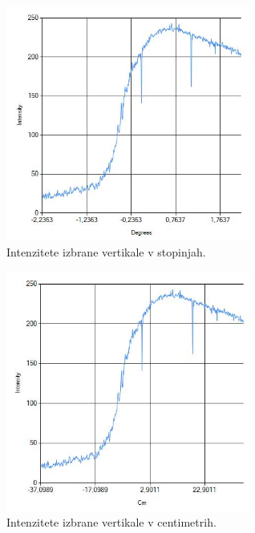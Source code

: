 \documentclass[oneside, a4paper, 12pt]{book}
\begin{document}
\begin{figure}
\begin{center}
\includegraphics[width=8cm]{slike/intenzitete.jpg}
\end{center}
\caption{Intenzitete izbrane vertikale v stopinjah.}
\label{pic:intenzitete1}
\end{figure}

\begin{figure}
\begin{center}
\includegraphics[width=8cm]{slike/intenzitete-v-cm.jpg}
\end{center}
\caption{Intenzitete izbrane vertikale v centimetrih.}
\label{pic:intenzitete2}
\end{figure}
\end{document}
